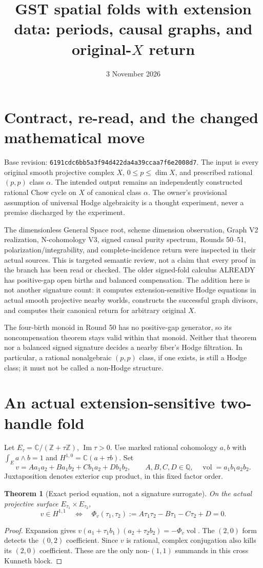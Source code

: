 \documentclass[11pt]{article}
\title{GST spatial folds with extension data: periods, causal graphs, and original-$X$ return}
\date{3 November 2026}
\newtheorem{theorem}{Theorem}
\newcommand{\Q}{\mathbb Q}
\newcommand{\C}{\mathbb C}
\begin{document}
\maketitle
\section{Contract, re-read, and the changed mathematical move}
Base revision: \texttt{6191cdc6bb5a3f94d422da4a39ccaa7f6e2008d7}.
The input is every original smooth projective complex $X$, $0\leq p\leq\dim X$,
and prescribed rational $(p,p)$ class $\alpha$. The intended output remains
an independently constructed rational Chow cycle on $X$ of canonical class
$\alpha$. The owner's provisional assumption of universal Hodge algebraicity
is a thought experiment, never a premise discharged by the experiment.

The dimensionless General Space root, scheme dimension observation,
Graph V2 realization, N-cohomology V3, signed causal purity spectrum,
Rounds 50--51, polarization/integrability, and complete-incidence return
were inspected in their actual sources. This is targeted semantic review,
not a claim that every proof in the branch has been read or checked.
The older signed-fold calculus ALREADY has positive-gap open births and
balanced compensation. The addition here is not another signature count:
it computes extension-sensitive Hodge equations in actual smooth projective
nearby worlds, constructs the successful graph divisors, and computes their
canonical return for arbitrary original $X$.

The four-birth monoid in Round 50 has no positive-gap generator, so its
noncompensation theorem stays valid within that monoid. Neither that theorem
nor a balanced signed signature decides a nearby fiber's Hodge filtration.
In particular, a rational nonalgebraic $(p,p)$ class, if one exists, is still
a Hodge class; it must not be called a non-Hodge structure.

\section{An actual extension-sensitive two-handle fold}
Let $E_\tau=\C/(\mathbb Z+\tau\mathbb Z)$, $\operatorname{Im}\tau>0$.
Use marked rational cohomology $a,b$ with $\int_Ea\wedge b=1$ and
$H^{1,0}=\C(a+\tau b)$. Set
\[
 v=Aa_1a_2+Ba_1b_2+Cb_1a_2+Db_1b_2,\qquad A,B,C,D\in\Q,
 \quad \operatorname{vol}=a_1b_1a_2b_2.
\]
Juxtaposition denotes exterior cup product, in this fixed factor order.
\begin{theorem}[Exact period equation, not a signature surrogate]
On the actual projective surface $E_{\tau_1}\times E_{\tau_2}$,
\[
 v\in H^{1,1}\quad\Longleftrightarrow\quad
 \Phi_v(\tau_1,\tau_2):=A\tau_1\tau_2-B\tau_1-C\tau_2+D=0. \tag{1}
\]
\end{theorem}
\begin{proof}
Expansion gives $v(a_1+\tau_1b_1)(a_2+\tau_2b_2)=-\Phi_v\operatorname{vol}$.
The $(2,0)$ form detects the $(0,2)$ coefficient. Since $v$ is rational,
complex conjugation also kills its $(2,0)$ coefficient. These are the only
non-$(1,1)$ summands in this cross Kunneth block.
\end{proof}
\end{document}
